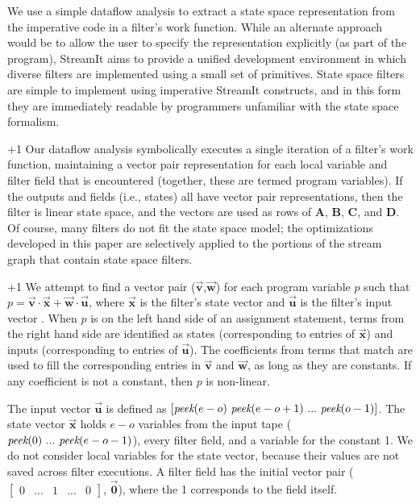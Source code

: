 
We use a simple dataflow analysis to extract a state space
representation from the imperative code in a filter's work function.
While an alternate approach would be to allow the user to specify the
representation explicitly (as part of the program), StreamIt aims to
provide a unified development environment in which diverse filters are
implemented using a small set of primitives.  State space filters are
simple to implement using imperative StreamIt constructs, and in this
form they are immediately readable by programmers unfamiliar with the
state space formalism.

\looseness+1 Our dataflow analysis symbolically executes a single iteration of a
filter's work function, maintaining a vector pair representation for
each local variable and filter field that is encountered (together,
these are termed program variables). If the outputs and fields (i.e.,
states) all have vector pair representations, then the filter is
linear state space, and the vectors are used as rows of $\mathbf{A}$,
$\mathbf{B}$, $\mathbf{C}$, and $\mathbf{D}$.  Of course, many filters
do not fit the state space model; the optimizations developed in this
paper are selectively applied to the portions of the stream graph that
contain state space filters.

\looseness+1 We attempt to find a vector pair ($\vec{\mathbf{v}}$,$\vec{\mathbf{w}}$) 
for each program variable $p$ such that $p = \vec{\mathbf{v}} \cdot
\vec{\mathbf{x}} + \vec{\mathbf{w}} \cdot \vec{\mathbf{u}}$, where  $\vec{\mathbf{x}}$ 
is the filter's state vector and $\vec{\mathbf{u}}$ is the filter's
input vector .  When $p$ is on the left hand side of an assignment
statement, terms from the right hand side are identified as states
(corresponding to entries of $\vec{\mathbf{x}}$) and inputs
(corresponding to entries of $\vec{\mathbf{u}}$).  The coefficients
from terms that match are used to fill the corresponding entries in
$\vec{\mathbf{v}}$ and $\vec{\mathbf{w}}$, as long as they are
constants. If any coefficient is not a constant, then $p$ is
non-linear.

The input vector $\vec{\mathbf{u}}$ is defined as $[\mbox{\it peek}(e-o)
~\mbox{\it peek}(e-o+1) ~... ~\mbox{\it peek}(o-1)]$. The state vector
$\vec{\mathbf{x}}$ holds $e-o$ variables from the input tape
($\mbox{\it peek}(0) ~... ~\mbox{\it peek}(e-o-1)$), every filter field, and a
variable for the constant 1. We do not consider local variables for
the state vector, because their values are not saved across filter
executions.
A filter field has the initial vector pair ($\left [ \begin{array}
{ccccc} 0 & ... & 1 & ... & 0 \end{array} \right ]$,
$\vec{\mathbf{0}}$), where the 1 corresponds to the field
itself.

